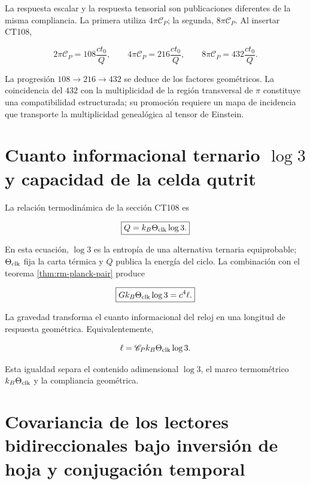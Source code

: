La respuesta escalar y la respuesta tensorial son publicaciones diferentes
de la misma compliancia. La primera utiliza \(4\pi\mathscr C_P\); la segunda,
\(8\pi\mathscr C_P\). Al insertar CT108,

\[
2\pi\mathscr C_P=108\frac{ct_0}{Q},
\qquad
4\pi\mathscr C_P=216\frac{ct_0}{Q},
\qquad
8\pi\mathscr C_P=432\frac{ct_0}{Q}.
\]

La progresi\'on \(108\to216\to432\) se deduce de los factores geom\'etricos.
La coincidencia del \(432\) con la multiplicidad de la regi\'on transversal
de \(\pi\) constituye una compatibilidad estructurada; su promoci\'on requiere
un mapa de incidencia que transporte la multiplicidad geneal\'ogica al tensor
de Einstein.

\section{Cuanto informacional ternario \(\log 3\) y capacidad de la celda qutrit}

La relaci\'on termodin\'amica de la secci\'on CT108 es

\begin{equation}
\boxed{Q=k_B\Theta_{\rm clk}\log3.}
\label{eq:rm-planck-trit}
\end{equation}

En esta ecuaci\'on, \(\log3\) es la entrop\'ia de una alternativa ternaria
equiprobable; \(\Theta_{\rm clk}\) fija la carta t\'ermica y \(Q\) publica la
energ\'ia del ciclo. La combinaci\'on con el teorema
\ref{thm:rm-planck-pair} produce

\begin{equation}
\boxed{
Gk_B\Theta_{\rm clk}\log3=c^4\ell.}
\label{eq:rm-gravity-information}
\end{equation}

La gravedad transforma el cuanto informacional del reloj en una longitud de
respuesta geom\'etrica. Equivalentemente,

\[
\ell=\mathscr C_P k_B\Theta_{\rm clk}\log3.
\]

Esta igualdad separa el contenido adimensional \(\log3\), el marco
termom\'etrico \(k_B\Theta_{\rm clk}\) y la compliancia geom\'etrica.

\section{Covariancia de los lectores bidireccionales bajo inversión de hoja y conjugación temporal}

